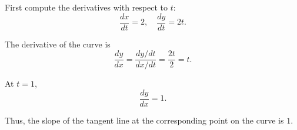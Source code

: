 \begin{Answer}[ref=parametric4]

    First compute the derivatives with respect to $t$:
    \begin{equation*}
        \frac{dx}{dt} = 2, \quad \frac{dy}{dt} = 2t.
    \end{equation*}

    The derivative of the curve is
    \begin{equation*}
        \frac{dy}{dx} = \frac{dy/dt}{dx/dt} = \frac{2t}{2} = t.
    \end{equation*}

    At $t = 1$,
    \begin{equation*}
        \frac{dy}{dx} = 1.
    \end{equation*}

    Thus, the slope of the tangent line at the corresponding point on the curve is $1$.

\end{Answer}
